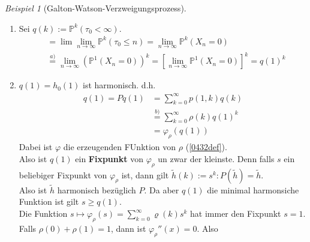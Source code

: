 \documentclass[10pt,a4paper]{article}
\newcommand{\Prb}{\mathbb P}
\theoremstyle{plain}
\theoremstyle{definition}
\theoremstyle{remark}
\newtheorem{exm}[theorem]{Beispiel}
\begin{document}
\begin{exm}[Galton-Watson-Verzweigungsprozess]
\begin{enumerate}
\begin{proof}
			\end{proof}
			\item Sei $q(k):=\Prb^k(\tau_0<\infty)$.\\
			\begin{align*}
			&=\lim\lim\limits_{n\to\infty}\Prb^k(\tau_0\leq n)=\lim\limits_{n\to\infty}\Prb^k(X_n=0)\\
			&\overset{a)}{=}\lim\limits_{n\to\infty}\left(\Prb^1(X_n=0)\right)^k=\left[\lim\limits_{n\to\infty}\Prb^1(X_n=0)\right]^k=q(1)^k
			\end{align*}
			\item $q(1)=h_0(1)$ ist harmonisch. d.h.
			\begin{align*}
			q(1)=Pq(1)&=\sum_{k=0}^{\infty}p(1,k)q(k)\\
			&\overset{b)}{=}\sum_{k=0}^\infty\rho(k)q(1)^k\\
			&=\varphi_\rho(q(1))
			\end{align*}
			Dabei ist $\varphi$ die erzeugenden FUnktion von $\rho$ (\ref{0432def}).\\
			Also ist $q(1)$ ein \textbf{Fixpunkt} von $\varphi_\rho$ un zwar der kleinste. Denn falls $s$ ein beliebiger Fixpunkt von $\varphi_\rho$ ist, dann gilt $\tilde h(k):=s^k:P(\tilde h)=\tilde h$.\\
			Also ist $\tilde h$ harmonisch bezüglich $P$. Da aber $q(1)$ die minimal harmonsiche Funktion ist gilt $s\geq q(1)$.\\
			Die Funktion $s\mapsto \varphi_\rho(s)=\sum_{k=0}^{\infty}\varrho(k)s^k$ hat immer den Fixpunkt $s=1$.\\
			Falls $\rho(0)+\rho(1)=1$, dann ist $\varphi_\rho''(x)=0$. Also 
		\end{enumerate}
	\end{exm}
\end{document}
